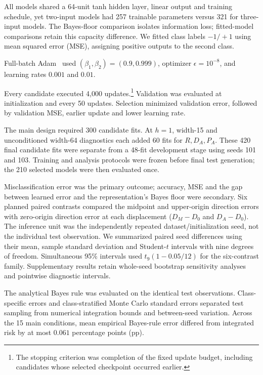 {All models shared a 64-unit tanh hidden layer, linear output and training schedule, yet two-input models had 257 trainable parameters versus 321 for three-input models. The Bayes-floor comparison isolates information loss; fitted-model comparisons retain this capacity difference. We fitted class labels $-1/+1$ using mean squared error (MSE), assigning positive outputs to the second class.
\par\begin{samepage}
\noindent Full-batch Adam~\citep{Kingma2015} used $(\beta_1,\beta_2)=(0.9,0.999)$, optimizer $\epsilon=10^{-8}$, and learning rates $0.001$ and $0.01$.
\end{samepage}
\newpage\noindent Every candidate executed\vadjust{\nobreak} 4,000 updates.\footnote{The stopping criterion was completion of the fixed update budget, including candidates whose selected checkpoint occurred earlier.} Validation was evaluated at initialization and every 50 updates. Selection minimized validation error, followed by validation MSE, earlier update and lower learning rate.

The main design required 300 candidate fits. At $h=1$, width-15 and unconditioned width-64 diagnostics each added 60 fits for $R,D_A,P_A$. These 420 final candidate fits were separate from a 48-fit development stage using seeds 101 and 103. Training and analysis protocols were frozen before final test generation; the 210 selected models were then evaluated once. 

Misclassification error was the primary outcome; accuracy, MSE and the gap between learned error and the representation's Bayes floor were secondary. Six planned paired contrasts compared the midpoint and upper-origin direction errors with zero-origin direction error at each displacement ($D_M-D_0$ and $D_A-D_0$). The inference unit was the independently repeated dataset/initialization seed, not the individual test observation. We summarized paired seed differences using their mean, sample standard deviation and Student-$t$ intervals with nine degrees of freedom. Simultaneous 95\% intervals used $t_9(1-0.05/12)$ for the six-contrast family. Supplementary results retain whole-seed bootstrap sensitivity analyses and pointwise diagnostic intervals.

The analytical Bayes rule was evaluated on the identical test observations. Class-specific errors and class-stratified Monte Carlo standard errors separated test sampling from numerical integration bounds and between-seed variation. Across the 15 main conditions, mean empirical Bayes-rule error differed from integrated risk by at most $0.061$ percentage points (pp).

}
